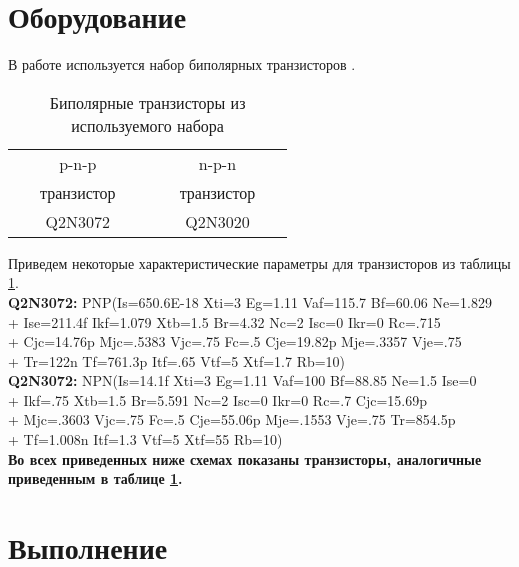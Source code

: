 \documentclass{semi}
\begin{document}

\section*{Оборудование}

В работе используется набор биполярных транзисторов .

\begin{table}[H]
	\centering
	\begin{tabular}{|cc|}
		\hline
		p-n-p			&n-p-n				\\
		~~~транзистор~~~&~~~транзистор~~~	\\ \hline
		Q2N3072			&Q2N3020			\\ \hline 
	\end{tabular}
	\caption{Биполярные транзисторы из используемого набора}
	\label{tab-trans} %
\end{table}

Приведем некоторые характеристические параметры для транзисторов из таблицы \ref{tab-trans}.\\

\textbf{{\normalsize Q2N3072:}}
PNP(Is=650.6E-18 Xti=3 Eg=1.11 Vaf=115.7 Bf=60.06 Ne=1.829\\
+
Ise=211.4f Ikf=1.079 Xtb=1.5 Br=4.32 Nc=2 Isc=0 Ikr=0 Rc=.715\\
+
Cjc=14.76p Mjc=.5383 Vjc=.75 Fc=.5 Cje=19.82p Mje=.3357 Vje=.75\\
+
Tr=122n Tf=761.3p Itf=.65 Vtf=5 Xtf=1.7 Rb=10)\\

\textbf{{\normalsize Q2N3072:}}
NPN(Is=14.1f Xti=3 Eg=1.11 Vaf=100 Bf=88.85 Ne=1.5 Ise=0\\
+
Ikf=.75 Xtb=1.5 Br=5.591 Nc=2 Isc=0 Ikr=0 Rc=.7 Cjc=15.69p\\
+
Mjc=.3603 Vjc=.75 Fc=.5 Cje=55.06p Mje=.1553 Vje=.75 Tr=854.5p\\
+
Tf=1.008n Itf=1.3 Vtf=5 Xtf=55 Rb=10)\\

\textbf{{\normalsize Во всех приведенных ниже схемах показаны транзисторы, аналогичные приведенным в таблице \ref{tab-trans}.}}

\newpage

\section*{Выполнение}
\end{document}
